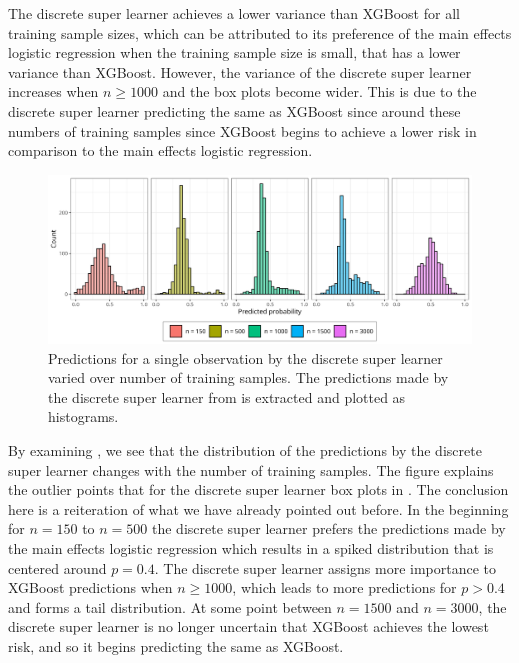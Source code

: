 \documentclass[./main.tex]{subfiles}
\begin{document}
The discrete super learner achieves a lower variance than XGBoost for all training sample sizes, which can be attributed to its preference of the main effects logistic regression when the training sample size is small, that has a lower variance than XGBoost. However, the variance of the discrete super learner increases when $ n \geq 1000 $ and the box plots become wider. This is due to the discrete super learner predicting the same as XGBoost since around these numbers of training samples since XGBoost begins to achieve a lower risk in comparison to the main effects logistic regression. 

\begin{figure}[H]
    \centering
    \includegraphics[width=\textwidth]{figures/preds_dsl_shift.png}
    \caption{Predictions for a single observation by the discrete super learner varied over number of training samples. The predictions made by the discrete super learner from  is extracted and plotted as histograms.}
    \label{fig:dsl_shift}
\end{figure}
By examining , we see that the distribution of the predictions by the discrete super learner changes with the number of training samples. The figure explains the outlier points that for the discrete super learner box plots in . The conclusion here is a reiteration of what we have already pointed out before. In the beginning for $ n = 150 $ to $ n = 500 $ the discrete super learner prefers the predictions made by the main effects logistic regression which results in a spiked distribution that is centered around $ p = 0.4 $. The discrete super learner assigns more importance to XGBoost predictions when $n \geq 1000$, which leads to more predictions for $p > 0.4$ and forms a tail distribution. At some point between $ n = 1500 $ and $ n = 3000 $, the discrete super learner is no longer uncertain that XGBoost achieves the lowest risk, and so it begins predicting the same as XGBoost. 
\end{document}
